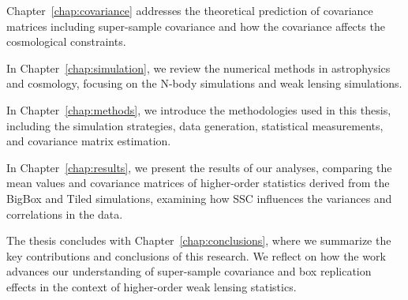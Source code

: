 Chapter~\ref{chap:covariance} addresses the theoretical prediction of covariance matrices including super-sample covariance and how the covariance affects the cosmological constraints. 

In Chapter~\ref{chap:simulation}, we review the numerical methods in astrophysics and cosmology, focusing on the N-body simulations and weak lensing simulations. 

In Chapter~\ref{chap:methods}, we introduce the methodologies used in this thesis, including the simulation strategies, data generation, statistical measurements, and covariance matrix estimation.

In Chapter~\ref{chap:results}, we present the results of our analyses, comparing the mean values and covariance matrices of higher-order statistics derived from the BigBox and Tiled simulations, examining how SSC influences the variances and correlations in the data.

The thesis concludes with Chapter~\ref{chap:conclusions}, where we summarize the key contributions and conclusions of this research. We reflect on how the work advances our understanding of super-sample covariance and box replication effects in the context of higher-order weak lensing statistics.